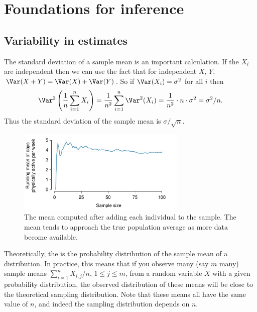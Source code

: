\chapter{Foundations for inference}
\label{foundationsForInference}

\section{Variability in estimates}
\label{variabilityInEstimates}

The standard deviation of a sample mean is an important calculation. If the $X_i$ are independent then we can use the fact that for independent $X$, $Y$, $\Var(X+Y)=\Var(X)+\Var(Y)$. So if $\Var(X_i)=\sigma^2$ for all $i$ then
\[
\Var^2\left(\frac1n\sum_{i=1}^nX_i\right) = \frac1{n^2}\sum_{i=1}^n\Var^2(X_i) = \frac1{n^2}\cdot n\cdot\sigma^2 = \sigma^2/n.
\]
Thus the standard deviation of the sample mean is $\sigma/\sqrt{n}$.



\begin{figure}%
   \centering
   \includegraphics[width=0.72\textwidth]{ch_inference_foundations/figures/yrbssActiveRunningMean/yrbssActiveRunningMean}
   \caption{The mean computed after adding each individual to the sample. The mean tends to approach the true population average as more data become available.}
   \label{yrbssActiveRunningMean}
\end{figure}


Theoretically, the  is the probability distribution of the sample mean of a distribution. In practice, this means that if you observe many (say $m$ many) sample means $\sum_{i=1}^n X_{i,j}/n$, $1\le j\le m$, from a random variable $X$ with a given probability distribution, the observed distribution of these means will be close to the theoretical sampling distribution. Note that these means all have the same value of $n$, and indeed the sampling distribution depends on $n$.

